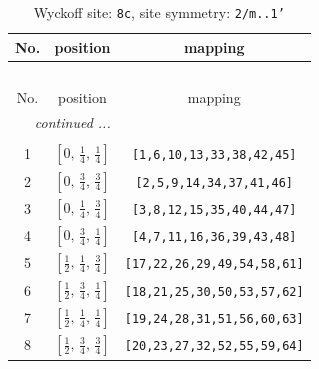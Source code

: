 \documentclass[fleqn,8pt]{jsarticle}
\begin{document}
\renewcommand{\arraystretch}{1.2}
\begin{longtable}{ccc}
\caption{Wyckoff site: {\tt 8c}, site symmetry: {\tt 2/m..1'}}
 \\
 \hline \hline
No. & position & mapping \\ \hline \endfirsthead

\multicolumn{2}{l}{\tablename\ \thetable{}} \\
 \hline \hline
No. & position & mapping \\ \hline \endhead

 \hline \hline
\multicolumn{2}{r}{\footnotesize\it continued ...} \\ \endfoot

 \hline \hline
\multicolumn{2}{r}{} \\ \endlastfoot

1 & $\left[ 0,\, \frac{1}{4},\, \frac{1}{4} \right]$ & {\tt [1,6,10,13,33,38,42,45]} \\ \hline
2 & $\left[ 0,\, \frac{3}{4},\, \frac{3}{4} \right]$ & {\tt [2,5,9,14,34,37,41,46]} \\ \hline
3 & $\left[ 0,\, \frac{1}{4},\, \frac{3}{4} \right]$ & {\tt [3,8,12,15,35,40,44,47]} \\ \hline
4 & $\left[ 0,\, \frac{3}{4},\, \frac{1}{4} \right]$ & {\tt [4,7,11,16,36,39,43,48]} \\ \hline
5 & $\left[ \frac{1}{2},\, \frac{1}{4},\, \frac{3}{4} \right]$ & {\tt [17,22,26,29,49,54,58,61]} \\ \hline
6 & $\left[ \frac{1}{2},\, \frac{3}{4},\, \frac{1}{4} \right]$ & {\tt [18,21,25,30,50,53,57,62]} \\ \hline
7 & $\left[ \frac{1}{2},\, \frac{1}{4},\, \frac{1}{4} \right]$ & {\tt [19,24,28,31,51,56,60,63]} \\ \hline
8 & $\left[ \frac{1}{2},\, \frac{3}{4},\, \frac{3}{4} \right]$ & {\tt [20,23,27,32,52,55,59,64]} \\
\end{longtable}
\renewcommand{\arraystretch}{1.2}
\end{document}
